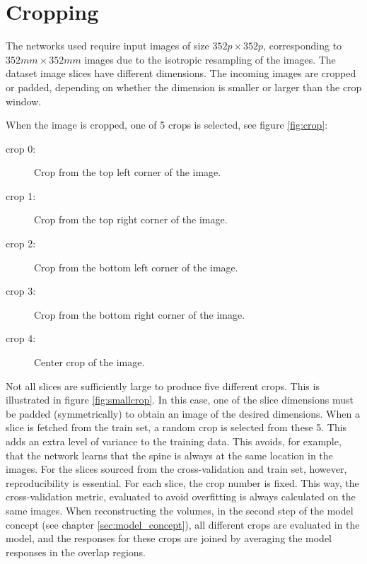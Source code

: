\section{Cropping\label{sec:cropping}}
\par{
The networks used require input images of size $352 p \times 352 p$, corresponding to $352 mm \times 352 mm$ images due to the isotropic resampling of the images.
The dataset image slices have different dimensions.
The incoming images are cropped or padded, depending on whether the dimension is smaller or larger than the crop window.
}



When the image is cropped, one of 5 crops is selected, see figure \ref{fig:crop}:
\begin{description}
    \item[crop 0:] Crop from the top left corner of the image.
    \item[crop 1:] Crop from the top right corner of the image.
    \item[crop 2:] Crop from the bottom left corner of the image.
    \item[crop 3:] Crop from the bottom right corner of the image.
    \item[crop 4:] Center crop of the image.  
\end{description}

\par{
Not all slices are sufficiently large to produce five different crops. This is illustrated in figure \ref{fig:smallcrop}. In this case, one of the slice dimensions must be padded (symmetrically) to obtain an image of the desired dimensions.
When a slice is fetched from the train set, a random crop is selected from these 5.
This adds an extra level of variance to the training data. This avoids, for example, that the network learns that the spine is always at the same location in the images.
For the slices sourced from the cross-validation and train set, however, reproducibility is essential.
For each slice, the crop number is fixed.
This way, the cross-validation metric, evaluated to avoid overfitting is always calculated on the same images.
When reconstructing the volumes, in the second step of the model concept (see chapter \ref{sec:model_concept}), 
all different crops are evaluated in the model, and the responses for these crops are joined by averaging the model responses in the overlap regions.
}

